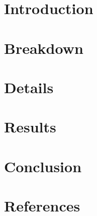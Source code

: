\documentclass[11pt]{article}
\begin{document}

\section{Introduction}
\label{sec:2_intro}


\section{Breakdown}
\label{sec:3_breakdown}


\section{Details}
\label{sec:4_details}



\section{Results}
\label{sec:5_results}


\section{Conclusion}
\label{sec:6_conclusion}





\renewcommand*{\UrlFont}{\rmfamily}



\nocite{*}

\section{References}



\appendix
\end{document}
